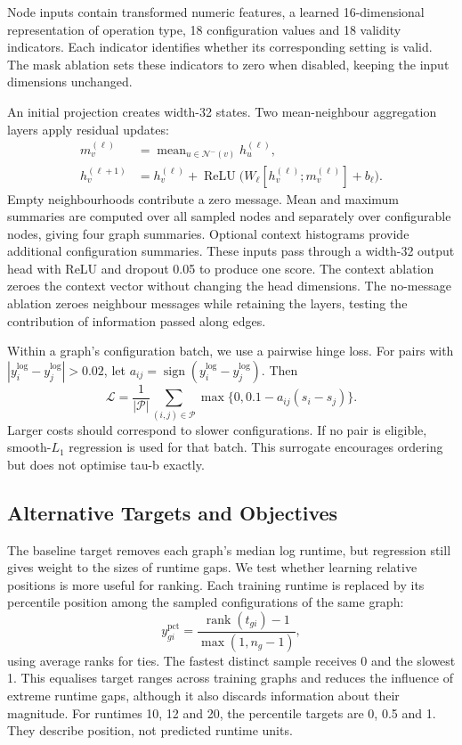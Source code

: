 \documentclass[letterpaper]{article}
\begin{document}
Node inputs contain transformed numeric features, a learned 16-dimensional representation of operation type, 18 configuration values and 18 validity indicators. Each indicator identifies whether its corresponding setting is valid. The mask ablation sets these indicators to zero when disabled, keeping the input dimensions unchanged.

An initial projection creates width-32 states. Two mean-neighbour aggregation layers apply residual updates:
\begin{align}
m_v^{(\ell)}&=\operatorname{mean}_{u\in\mathcal N^-(v)}h_u^{(\ell)},\\
h_v^{(\ell+1)}&=h_v^{(\ell)}+\operatorname{ReLU}
 \bigl(W_\ell[h_v^{(\ell)};m_v^{(\ell)}]+b_\ell\bigr).
\end{align}
Empty neighbourhoods contribute a zero message. Mean and maximum summaries are computed over all sampled nodes and separately over configurable nodes, giving four graph summaries. Optional context histograms provide additional configuration summaries. These inputs pass through a width-32 output head with ReLU and dropout 0.05 to produce one score. The context ablation zeroes the context vector without changing the head dimensions. The no-message ablation zeroes neighbour messages while retaining the layers, testing the contribution of information passed along edges.

Within a graph's configuration batch, we use a pairwise hinge loss. For pairs with $|y_i^{\log}-y_j^{\log}|>0.02$, let $a_{ij}=\operatorname{sign}(y_i^{\log}-y_j^{\log})$. Then
\begin{equation}
\mathcal L=\frac{1}{|\mathcal P|}\sum_{(i,j)\in\mathcal P}
\max\{0,0.1-a_{ij}(s_i-s_j)\}.
\end{equation}
Larger costs should correspond to slower configurations. If no pair is eligible, smooth-$L_1$ regression is used for that batch. This surrogate encourages ordering but does not optimise tau-b exactly.

\subsection{Alternative Targets and Objectives}
\label{sec:targets}
The baseline target removes each graph's median log runtime, but regression still gives weight to the sizes of runtime gaps. We test whether learning relative positions is more useful for ranking. Each training runtime is replaced by its percentile position among the sampled configurations of the same graph:
\begin{equation}
y^{\mathrm{pct}}_{gi}=\frac{\operatorname{rank}(t_{gi})-1}{\max(1,n_g-1)},
\end{equation}
using average ranks for ties. The fastest distinct sample receives 0 and the slowest 1. This equalises target ranges across training graphs and reduces the influence of extreme runtime gaps, although it also discards information about their magnitude. For runtimes 10, 12 and 20, the percentile targets are 0, 0.5 and 1. They describe position, not predicted runtime units.
\end{document}
